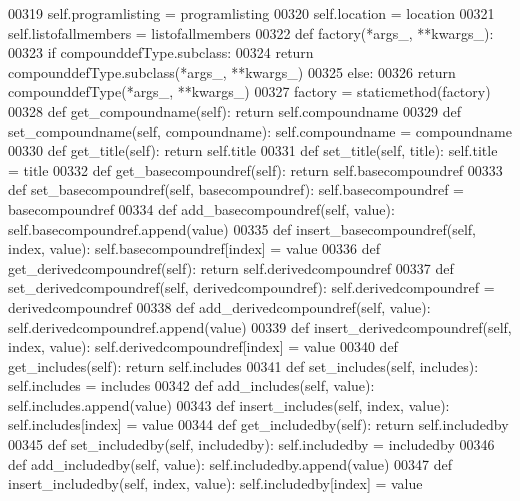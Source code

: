 \begin{DoxyCode}
{{{{{{{{{{{{{{{{{{{{{{{{00319         self.programlisting = programlisting
00320         self.location = location
00321         self.listofallmembers = listofallmembers
00322     \textcolor{keyword}{def }factory(*args\_, **kwargs\_):
00323         \textcolor{keywordflow}{if} compounddefType.subclass:
00324             \textcolor{keywordflow}{return} compounddefType.subclass(*args\_, **kwargs\_)
00325         \textcolor{keywordflow}{else}:
00326             \textcolor{keywordflow}{return} compounddefType(*args\_, **kwargs\_)
00327     factory = staticmethod(factory)
00328     \textcolor{keyword}{def }get_compoundname(self): \textcolor{keywordflow}{return} self.compoundname
00329     \textcolor{keyword}{def }set_compoundname(self, compoundname): self.compoundname = compoundname
00330     \textcolor{keyword}{def }get_title(self): \textcolor{keywordflow}{return} self.title
00331     \textcolor{keyword}{def }set_title(self, title): self.title = title
00332     \textcolor{keyword}{def }get_basecompoundref(self): \textcolor{keywordflow}{return} self.basecompoundref
00333     \textcolor{keyword}{def }set_basecompoundref(self, basecompoundref): self.basecompoundref = basecompoundref
00334     \textcolor{keyword}{def }add_basecompoundref(self, value): self.basecompoundref.append(value)
00335     \textcolor{keyword}{def }insert_basecompoundref(self, index, value): self.basecompoundref[index] = value
00336     \textcolor{keyword}{def }get_derivedcompoundref(self): \textcolor{keywordflow}{return} self.derivedcompoundref
00337     \textcolor{keyword}{def }set_derivedcompoundref(self, derivedcompoundref): self.derivedcompoundref = derivedcompoundref
00338     \textcolor{keyword}{def }add_derivedcompoundref(self, value): self.derivedcompoundref.append(value)
00339     \textcolor{keyword}{def }insert_derivedcompoundref(self, index, value): self.derivedcompoundref[index] = value
00340     \textcolor{keyword}{def }get_includes(self): \textcolor{keywordflow}{return} self.includes
00341     \textcolor{keyword}{def }set_includes(self, includes): self.includes = includes
00342     \textcolor{keyword}{def }add_includes(self, value): self.includes.append(value)
00343     \textcolor{keyword}{def }insert_includes(self, index, value): self.includes[index] = value
00344     \textcolor{keyword}{def }get_includedby(self): \textcolor{keywordflow}{return} self.includedby
00345     \textcolor{keyword}{def }set_includedby(self, includedby): self.includedby = includedby
00346     \textcolor{keyword}{def }add_includedby(self, value): self.includedby.append(value)
00347     \textcolor{keyword}{def }insert_includedby(self, index, value): self.includedby[index] = value
}}}}}}}}}}}}}}}}}}}}}}}}
\end{DoxyCode}

